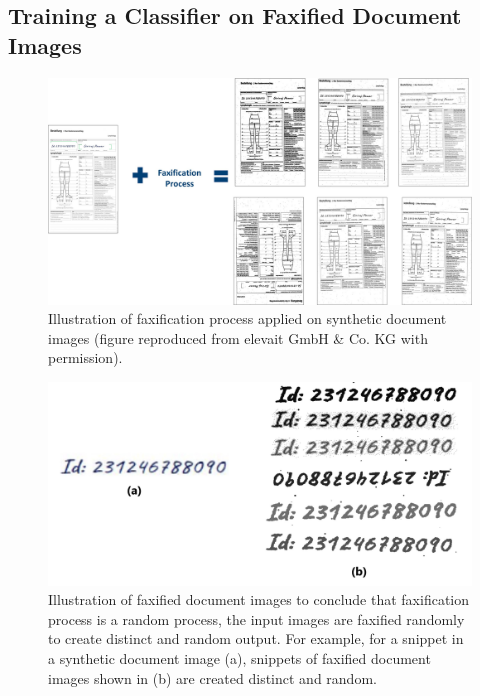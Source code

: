 \subsection{Training a Classifier on Faxified Document Images}\label{trainingfaxifiedclassifier}


\begin{figure}[H]
        \begin{center}
	    \includegraphics[scale=0.25]{images/Evaluation/FaxificationProcess.jpg}
	    \caption[Illustration of faxification process applied on synthetic document images.]{Illustration of faxification process applied on synthetic document images (figure reproduced from elevait GmbH \& Co. KG with permission).}
	    \label{fig:FaxificationProcess}
	    \end{center}
\end{figure}

\begin{figure}[H]
        \begin{center}
	    \includegraphics[scale=0.15]{images/Evaluation/FaxificationProcessZoomed.jpg}
	    \caption[Illustration of faxified document images to conclude that faxification process is a random process, the input images are faxified randomly to create distinct output.]{Illustration of faxified document images to conclude that faxification process is a random process, the input images are faxified randomly to create distinct and random output. For example, for a snippet in a synthetic document image (a), snippets of faxified document images shown in (b) are created distinct and random.}
	    \label{fig:FaxificationProcessZoomed}
	    \end{center}
\end{figure}


